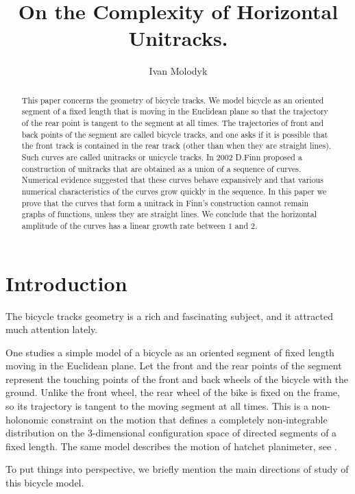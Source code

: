 \documentclass{article}
\title{On the Complexity of Horizontal Unitracks.}
\author{Ivan Molodyk}
\date{}
\theoremstyle{definition}
\begin{document}
\maketitle

\begin{abstract}
    This paper concerns the geometry of bicycle tracks. We model bicycle as an oriented segment of a fixed length that is moving in the Euclidean plane so that the trajectory of the rear point is tangent to the segment at all times. The trajectories of front and back points of the segment are called bicycle tracks, and one asks if it is possible that the front track is contained in the rear track (other than when they are straight lines). Such curves are called unitracks or unicycle tracks. In 2002 D.Finn proposed a construction of unitracks that are obtained as a union of a sequence of curves. Numerical evidence suggested that these curves behave expansively and that various numerical characteristics of the curves grow quickly in the sequence. In this paper we prove that the curves that form a unitrack in Finn's construction cannot remain graphs of functions, unless they are straight lines. We conclude that the horizontal amplitude of the curves has a linear growth rate between $1$ and $2$.
\end{abstract}

\large 

\section{Introduction}

The bicycle tracks geometry is a rich and fascinating subject, and it attracted much attention lately. 

One studies a simple model of a bicycle as an oriented segment of fixed length moving in the Euclidean plane. Let the front and the rear points of the segment represent the touching points of the front and back wheels of the bicycle with the ground. Unlike the front wheel, the rear wheel of the bike is fixed on the frame, so its trajectory is tangent to the moving segment at all times. This is a non-holonomic constraint on the motion that defines a completely non-integrable distribution on the 3-dimensional configuration space of directed segments of a fixed length.
The same model describes the motion of hatchet planimeter, see \cite{Fo,FLT}.

To put things into perspective, we briefly mention the main directions of study of this bicycle model. 
\end{document}
